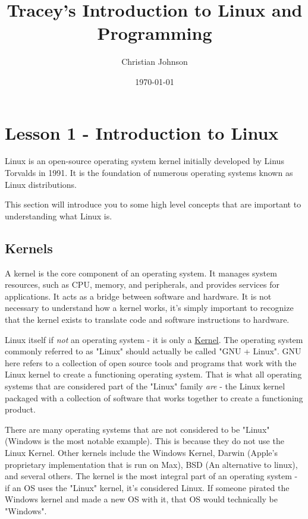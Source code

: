 \documentclass[11pt]{article}
\author{Christian Johnson}
\date{\today}
\title{Tracey's Introduction to Linux and Programming}
\begin{document}
\maketitle
\setcounter{tocdepth}{2}
\tableofcontents

\newpage

\section{Lesson 1 - Introduction to Linux}
\label{sec:org7c9f419}
Linux is an open-source operating system kernel initially developed by Linus Torvalds in 1991. It is the foundation of numerous operating systems known as Linux distributions.

This section will introduce you to some high level concepts that are important to understanding what Linux is.

\subsection{Kernels}
\label{sec:org5649b0a}
A kernel is the core component of an operating system. It manages system resources, such as CPU, memory, and peripherals, and provides services for applications. It acts as a bridge between software and hardware. It is not necessary to understand how a kernel works, it's simply important to recognize that the kernel exists to translate code and software instructions to hardware. 

Linux itself if \emph{not} an operating system - it is only a \hyperref[sec:org5649b0a]{Kernel}. The operating system commonly referred to as "Linux" should actually be called "GNU + Linux". GNU here refers to a collection of open source tools and programs that work with the Linux kernel to create a functioning operating system. That is what all operating systems that are considered part of the "Linux" family \emph{are} - the Linux kernel packaged with a collection of software that works together to create a functioning product.

There are many operating systems that are not considered to be "Linux" (Windows is the most notable example). This is because they do not use the Linux Kernel. Other kernels include the Windows Kernel, Darwin (Apple's proprietary implementation that is run on Max), BSD (An alternative to linux), and several others. The kernel is the most integral part of an operating system - if an OS uses the "Linux" kernel, it's considered Linux. If someone pirated the Windows kernel and made a new OS with it, that OS would technically be "Windows".
\end{document}
